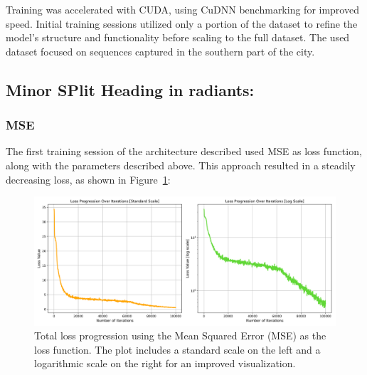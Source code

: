 Training was accelerated with CUDA, using CuDNN benchmarking for improved speed. Initial training sessions utilized only a portion of the dataset to refine the model’s structure and functionality before scaling to the full dataset. The used dataset focused on sequences captured in the southern part of the city. 

\subsection*{Minor SPlit Heading in radiants:}
\subsubsection*{MSE}
The first training session of the architecture described used MSE as loss function, along with the parameters described above. This approach resulted in a steadily decreasing loss, as shown in Figure~\ref{fig:mse-loss-progression}:
\begin{figure}[H]
    \centering
    \includegraphics[width=1\linewidth]{LateX//figs/loss_total_mse_progression_comparison.png}
    \caption{Total loss progression using the Mean Squared Error (MSE) as the loss function. The plot includes a standard scale on the left and a logarithmic scale on the right for an improved visualization.}
    \label{fig:mse-loss-progression}
\end{figure}

